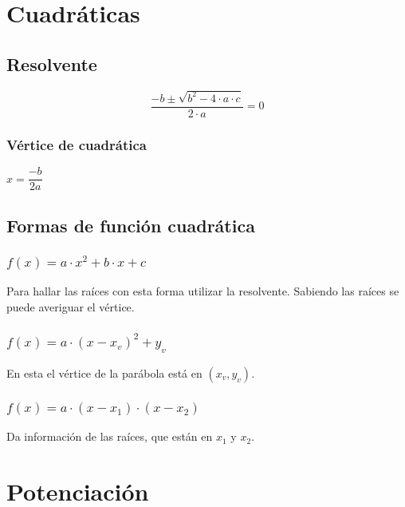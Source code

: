 \section{Cuadráticas}


\begin{multicols}{2}
\subsection*{Resolvente}

$$\dfrac{-b \pm \sqrt{b^2 - 4\cdot a \cdot c}}{2\cdot a} = 0$$

\subsubsection*{Vértice de cuadrática}

\hfil$x= \dfrac{-b}{2a}$\hfil
    
\end{multicols}


\subsection*{Formas de función cuadrática}

\subsubsection*{
$f(x)=a\cdot x^2 + b \cdot x + c$}

Para hallar las raíces con esta forma utilizar la resolvente. Sabiendo las raíces se puede averiguar el vértice. 

\subsubsection*{
$f(x)= a\cdot(x-x_v)^2 + y_v$}

En esta el vértice de la parábola está en $(x_v, y_v)$.

\subsubsection*{
$f(x)=a\cdot (x-x_1) \cdot (x-x_2)$}

Da información de las raíces, que están en $x_1$ y $x_2$.


\section{Potenciación}

